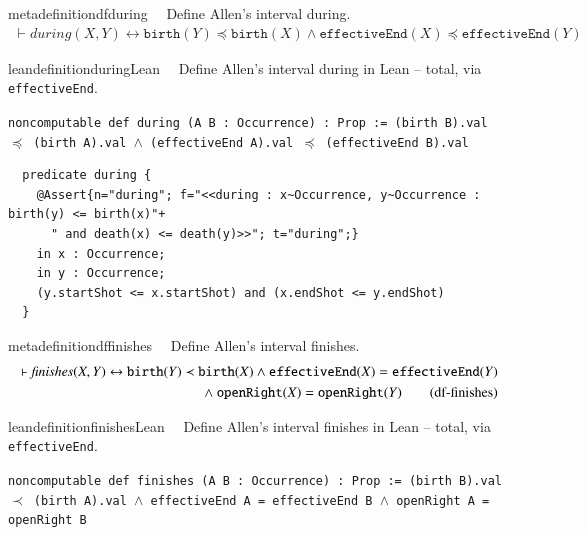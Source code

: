 \begin{restatable}{metadefinition}{dfduring}~~ Define Allen's interval during.
\begin{align}
\vdash \textit{during}(X,Y) \leftrightarrow \texttt{birth}(Y) \preccurlyeq \texttt{birth}(X) \wedge \texttt{effectiveEnd}(X) \preccurlyeq \texttt{effectiveEnd}(Y)
\label{eq:df-during}\tag{df-during}
\end{align}
\end{restatable}

\begin{restatable}{leandefinition}{duringLean}~~ Define Allen's interval during in Lean --
total, via \texttt{effectiveEnd}.

\texttt{\textcolor{leancolor}{noncomputable def} \textcolor{leanyellow}{during} (A B : Occurrence) : Prop := (birth B).val $\preccurlyeq$ (birth A).val $\wedge$ (effectiveEnd A).val $\preccurlyeq$ (effectiveEnd B).val}
\label{during}
\end{restatable}

\begin{lstlisting}
  predicate during {
    @Assert{n="during"; f="<<during : x~Occurrence, y~Occurrence : birth(y) <= birth(x)"+
      " and death(x) <= death(y)>>"; t="during";}
    in x : Occurrence;
    in y : Occurrence;
    (y.startShot <= x.startShot) and (x.endShot <= y.endShot)
  }
\end{lstlisting}

\begin{restatable}{metadefinition}{dffinishes}~~ Define Allen's interval finishes.
\begin{align}
\vdash \textit{finishes}(X,Y) \leftrightarrow \texttt{birth}(Y) \prec \texttt{birth}(X) \wedge \texttt{effectiveEnd}(X) = \texttt{effectiveEnd}(Y) \notag \\
~\wedge~ \texttt{openRight}(X) = \texttt{openRight}(Y)
\label{eq:df-finishes}\tag{df-finishes}
\end{align}
\end{restatable}

\begin{restatable}{leandefinition}{finishesLean}~~ Define Allen's interval finishes in Lean
-- total, via \texttt{effectiveEnd}.

\texttt{\textcolor{leancolor}{noncomputable def} \textcolor{leanyellow}{finishes} (A B : Occurrence) : Prop := (birth B).val $\prec$ (birth A).val $\wedge$ effectiveEnd A = effectiveEnd B $\wedge$ openRight A = openRight B}
\label{finishes}
\end{restatable}

